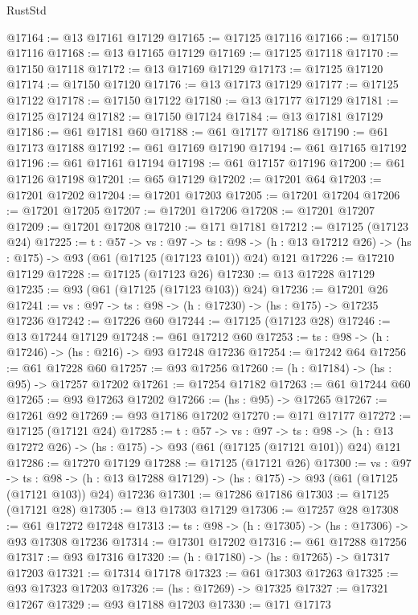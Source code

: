 \begin{lexlean}{RustStd}
\begin{coremodule}
@17164 := @13 @17161 @17129
@17165 := @17125 @17116
@17166 := @17150 @17116
@17168 := @13 @17165 @17129
@17169 := @17125 @17118
@17170 := @17150 @17118
@17172 := @13 @17169 @17129
@17173 := @17125 @17120
@17174 := @17150 @17120
@17176 := @13 @17173 @17129
@17177 := @17125 @17122
@17178 := @17150 @17122
@17180 := @13 @17177 @17129
@17181 := @17125 @17124
@17182 := @17150 @17124
@17184 := @13 @17181 @17129
@17186 := @61 @17181 @60
@17188 := @61 @17177 @17186
@17190 := @61 @17173 @17188
@17192 := @61 @17169 @17190
@17194 := @61 @17165 @17192
@17196 := @61 @17161 @17194
@17198 := @61 @17157 @17196
@17200 := @61 @17126 @17198
@17201 := @65 @17129
@17202 := @17201 @64
@17203 := @17201 @17202
@17204 := @17201 @17203
@17205 := @17201 @17204
@17206 := @17201 @17205
@17207 := @17201 @17206
@17208 := @17201 @17207
@17209 := @17201 @17208
@17210 := @171 @17181
@17212 := @17125 (@17123 @24)
@17225 := {t : @57} ->
  {vs : @97} ->
  {ts : @98} -> (h : @13 @17212 @26) -> (hs : @175) -> @93 (@61 (@17125 (@17123 @101)) @24) @121
@17226 := @17210 @17129
@17228 := @17125 (@17123 @26)
@17230 := @13 @17228 @17129
@17235 := @93 (@61 (@17125 (@17123 @103)) @24)
@17236 := @17201 @26
@17241 := {vs : @97} -> {ts : @98} -> (h : @17230) -> (hs : @175) -> @17235 @17236
@17242 := @17226 @60
@17244 := @17125 (@17123 @28)
@17246 := @13 @17244 @17129
@17248 := @61 @17212 @60
@17253 := {ts : @98} -> (h : @17246) -> (hs : @216) -> @93 @17248 @17236
@17254 := @17242 @64
@17256 := @61 @17228 @60
@17257 := @93 @17256
@17260 := (h : @17184) -> (hs : @95) -> @17257 @17202
@17261 := @17254 @17182
@17263 := @61 @17244 @60
@17265 := @93 @17263 @17202
@17266 := (hs : @95) -> @17265
@17267 := @17261 @92
@17269 := @93 @17186 @17202
@17270 := @171 @17177
@17272 := @17125 (@17121 @24)
@17285 := {t : @57} ->
  {vs : @97} ->
  {ts : @98} -> (h : @13 @17272 @26) -> (hs : @175) -> @93 (@61 (@17125 (@17121 @101)) @24) @121
@17286 := @17270 @17129
@17288 := @17125 (@17121 @26)
@17300 := {vs : @97} ->
  {ts : @98} ->
  (h : @13 @17288 @17129) -> (hs : @175) -> @93 (@61 (@17125 (@17121 @103)) @24) @17236
@17301 := @17286 @17186
@17303 := @17125 (@17121 @28)
@17305 := @13 @17303 @17129
@17306 := @17257 @28
@17308 := @61 @17272 @17248
@17313 := {ts : @98} -> (h : @17305) -> (hs : @17306) -> @93 @17308 @17236
@17314 := @17301 @17202
@17316 := @61 @17288 @17256
@17317 := @93 @17316
@17320 := (h : @17180) -> (hs : @17265) -> @17317 @17203
@17321 := @17314 @17178
@17323 := @61 @17303 @17263
@17325 := @93 @17323 @17203
@17326 := (hs : @17269) -> @17325
@17327 := @17321 @17267
@17329 := @93 @17188 @17203
@17330 := @171 @17173

\end{coremodule}
\end{lexlean}
